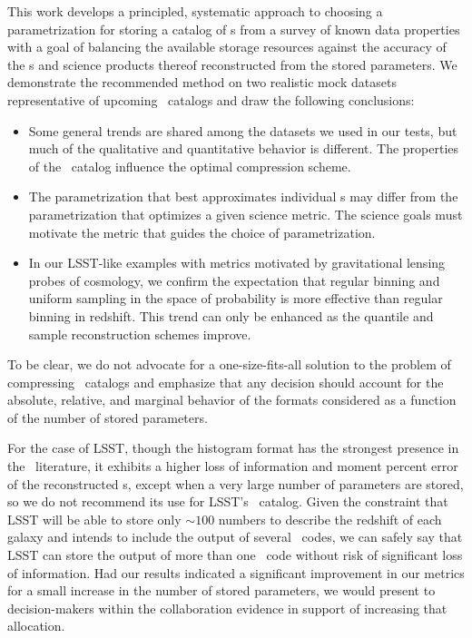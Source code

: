 This work develops a principled, systematic approach to choosing a 
parametrization for storing a catalog of \pz s from a survey of known data 
properties with a goal of balancing the available storage resources against the 
accuracy of the \pz s and science products thereof reconstructed from the 
stored parameters.
We demonstrate the recommended method on two realistic mock datasets 
representative of upcoming \pz\ catalogs and draw the following conclusions:
\begin{itemize}
	\item Some general trends are shared among the datasets we used in our tests, 
	but much of the qualitative and quantitative behavior is different.
	The properties of the \pz\ catalog influence the optimal compression scheme.
	\item The parametrization that best approximates individual \pz s may differ 
	from the parametrization that optimizes a given science metric.
	The science goals must motivate the metric that guides the choice of 
	parametrization.
	\item In our LSST-like examples with metrics motivated by gravitational 
	lensing probes of cosmology, we confirm the expectation that regular binning 
	and uniform sampling in the space of probability is more effective than regular 
	binning in redshift.
	This trend can only be enhanced as the quantile and sample reconstruction 
	schemes improve.
\end{itemize}
To be clear, we do not advocate for a one-size-fits-all solution to the problem 
of compressing \pz\ catalogs and emphasize that any decision should account for 
the absolute, relative, and marginal behavior of the formats considered as a 
function of the number of stored parameters.

For the case of LSST, though the histogram format has the strongest presence in 
the \pz\ literature, it exhibits a higher loss of information and moment 
percent error of the reconstructed \pz s, except when a very large number of 
parameters are stored, so we do not recommend its use for LSST's \pz\ catalog.
Given the constraint that LSST will be able to store only $\sim100$ numbers to 
describe the redshift of each galaxy and intends to include the output of 
several \pz\ codes, we can safely say that LSST can store the output of more 
than one \pz\ code without risk of significant loss of information.
Had our results indicated a significant improvement in our metrics for a small 
increase in the number of stored parameters, we would present to 
decision-makers within the collaboration evidence in support of increasing that 
allocation.

